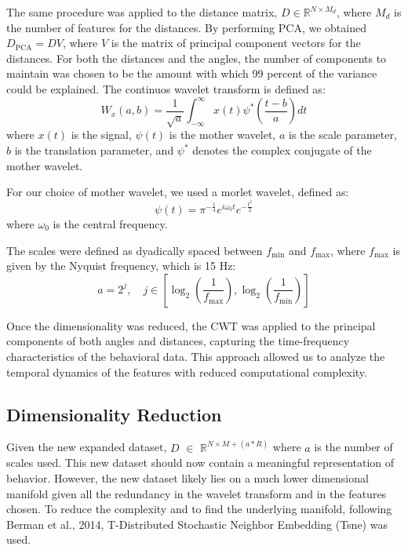 \documentclass[12pt,english]{article}
\begin{document}
The same procedure was applied to the distance matrix, \( D \in \mathbb{R}^{N \times M_{d}} \), where \( M_{d} \) is the number of features for the distances. By performing PCA, we obtained \( D_{\text{PCA}} = D V \), where \( V \) is the matrix of principal component vectors for the distances. For both the distances and the angles, the number of components to maintain was chosen to be the amount with which 99 percent of the variance could be explained. 
The continuos wavelet transform is defined as:
\[
W_x(a, b) = \frac{1}{\sqrt{a}} \int_{-\infty}^{\infty} x(t) \psi^*\left(\frac{t - b}{a}\right) dt
\]
where \( x(t) \) is the signal, \( \psi(t) \) is the mother wavelet, \( a \) is the scale parameter, \( b \) is the translation parameter, and \( \psi^* \) denotes the complex conjugate of the mother wavelet.

For our choice of mother wavelet, we used a morlet wavelet, defined as:
\[
\psi(t) = \pi^{-\frac{1}{4}} e^{i \omega_0 t} e^{-\frac{t^2}{2}}
\]
where \( \omega_0 \) is the central frequency. 

The scales were defined as dyadically spaced between \( f_{\min} \) and \( f_{\max} \), where \( f_{\max} \) is given by the Nyquist frequency, which is 15 Hz:
\[
a = 2^j, \quad j \in \left[\log_2\left(\frac{1}{f_{\max}}\right), \log_2\left(\frac{1}{f_{\min}}\right)\right]
\]


Once the dimensionality was reduced, the CWT was applied to the principal components of both angles and distances, capturing the time-frequency characteristics of the behavioral data. This approach allowed us to analyze the temporal dynamics of the features with reduced computational complexity.



\subsection{Dimensionality Reduction}
Given the new expanded dataset, \( D \) $\in$ \( \mathbb{R}^{N \times M+(a * R)} \) where \( a \) is the number of scales used. This new dataset should now contain a meaningful representation of behavior. However, the new dataset likely lies on a much lower dimensional manifold given all the redundancy in the wavelet transform and in the features chosen. To reduce the complexity and to find the underlying manifold, following Berman et al., 2014, T-Distributed Stochastic Neighbor Embedding (Tsne) was used. 
\end{document}
